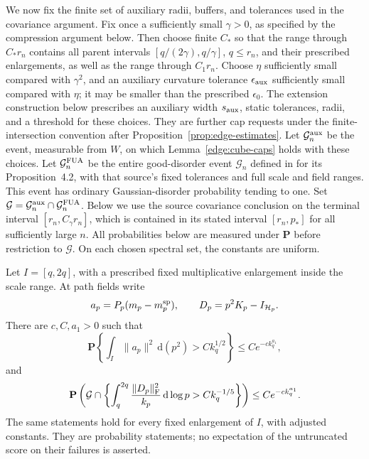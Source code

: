 We now fix the finite set of auxiliary radii, buffers, and tolerances
used in the covariance argument.  Fix once a sufficiently small
\(\gamma>0\), as specified by the compression argument below.  Then
choose finite \(C_*\) so that the range through \(C_*r_n\) contains
all parent intervals \([q/(2\gamma),q/\gamma]\), \(q\le r_n\), and
their prescribed enlargements, as well as the range through \(C_1r_n\).
Choose \(\eta\) sufficiently small compared with \(\gamma^2\), and an
auxiliary curvature tolerance \(\epsilon_{\rm aux}\) sufficiently small
compared with \(\eta\); it may be smaller than the prescribed
\(\epsilon_0\).  The extension construction below prescribes an
auxiliary width \(s_{\rm aux}\), static tolerances, radii, and a threshold
for these choices.  They are further cap requests under the
finite-intersection convention after Proposition~\ref{prop:edge-estimates}.
Let \(\mathcal G_n^{\rm aux}\) be the event, measurable from \(W\), on which
Lemma~\ref{edge:cube-caps} holds with these choices.  Let
\(\mathcal G_n^{\rm FUA}\) be the entire good-disorder event
\(\mathcal G_n\) defined in \cite[Section~3]{FUA} for its
Proposition~4.2, with that source's fixed tolerances and full scale and
field ranges.  This event has ordinary Gaussian-disorder probability
tending to one.  Set
\(\mathcal G=\mathcal G_n^{\rm aux}\cap\mathcal G_n^{\rm FUA}\).
Below we use the source covariance conclusion on the terminal interval
\([r_n,C_\gamma r_n]\), which is contained in its stated interval
\([r_n,p_*]\) for all sufficiently large \(n\).
All probabilities below are measured under \(\mathbf P\)
before restriction to \(\mathcal G\).  On each chosen spectral set,
the constants are uniform.

\begin{lemma}
\label{edge:score-covariance}
Let \(I=[q,2q]\), with a prescribed fixed multiplicative enlargement
inside the scale range.  At path fields write
\[
 a_p=P_p(m_p-m_p^{\rm sp}),\qquad D_p=p^2K_p-I_{\mathcal H_p}.
\]
There are \(c,C,a_1>0\) such that
\begin{equation}\label{edge:score-bound}
 \mathbf P\left\{
   \int_I\|a_p\|^2\,\mathrm d(p^2)>Ck_q^{1/2}\right\}
       \le C e^{-c k_q^{a_1}},
\end{equation}
and
\begin{equation}\label{edge:frobenius-bound}
 \mathbf P\left(
 \mathcal G\cap
 \left\{\int_q^{2q}\frac{\|D_p\|_{\rm F}^2}{k_p}\,\mathrm d\log p
              >Ck_q^{-1/5}\right\}\right)
       \le C e^{-c k_q^{a_1}} .
\end{equation}
The same statements hold for every fixed enlargement of \(I\), with
adjusted constants.  They are probability statements; no expectation
of the untruncated score on their failures is asserted.
\end{lemma}

